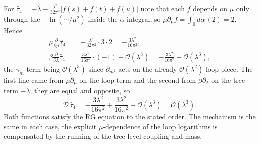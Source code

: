\begin{solution}
For $\hat\tau_4 = -\lambda - \frac{\lambda^2}{32\pi^2}\big[f(s)+f(t)+f(u)\big]$ note that each $f$ depends on $\mu$ only through the $-\ln(\cdots/\mu^2)$ inside the $\alpha$-integral, so $\mu\partial_\mu f = \int_0^1 d\alpha\,(2) = 2$. Hence
\begin{align}
    \mu\frac{\partial}{\partial\mu}\hat\tau_4 &= -\frac{\lambda^2}{32\pi^2}\cdot 3\cdot 2 = -\frac{3\lambda^2}{16\pi^2}, \\
    \beta\frac{\partial}{\partial\lambda}\hat\tau_4 &= \frac{3\lambda^2}{16\pi^2}\cdot(-1) + \mathcal{O}(\lambda^3) = -\frac{3\lambda^2}{16\pi^2} + \mathcal{O}(\lambda^3),
\end{align}
the $\gamma_m$ term being $\mathcal{O}(\lambda^3)$ since $\partial_{m^2}$ acts on the already-$\mathcal{O}(\lambda^2)$ loop piece. The first line came from $\mu\partial_\mu$ on the loop term and the second from $\beta\partial_\lambda$ on the tree term $-\lambda$; they are equal and opposite, so
\begin{equation}
    \mathcal{D}\,\hat\tau_4 = -\frac{3\lambda^2}{16\pi^2} + \frac{3\lambda^2}{16\pi^2} + \mathcal{O}(\lambda^3) = \mathcal{O}(\lambda^3).
\end{equation}
Both functions satisfy the RG equation to the stated order. The mechanism is the same in each case, the explicit $\mu$-dependence of the loop logarithms is compensated by the running of the tree-level coupling and mass.
 

\end{solution}
